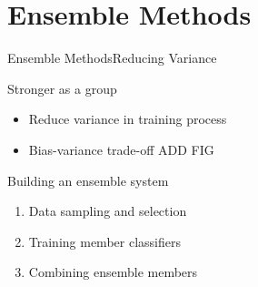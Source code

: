 \section{Ensemble Methods}
\begin{frame}{Ensemble Methods}{Reducing Variance}
\begin{block}{Stronger as a group}
    \begin{itemize}
        \item Reduce variance in training process
        \item Bias-variance trade-off ADD FIG
    \end{itemize}
\end{block}
\begin{block}{Building an ensemble system}
    \begin{enumerate}
        \item Data sampling and selection
        \item Training member classifiers
        \item Combining ensemble members
    \end{enumerate}
\end{block}
\end{frame}

